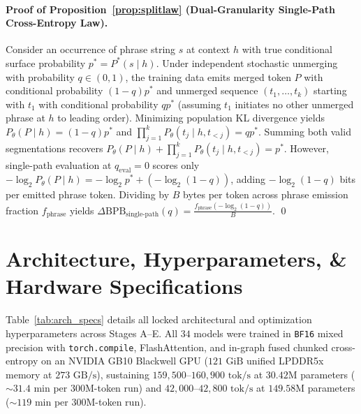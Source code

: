 \documentclass[11pt,a4paper]{article}
\begin{document}
\paragraph{Proof of Proposition~\ref{prop:splitlaw} (Dual-Granularity Single-Path Cross-Entropy Law).}
Consider an occurrence of phrase string $s$ at context $h$ with true conditional surface probability $p^* = P^*(s \mid h)$. Under independent stochastic unmerging with probability $q \in (0, 1)$, the training data emits merged token $P$ with conditional probability $(1-q)p^*$ and unmerged sequence $(t_1, \dots, t_k)$ starting with $t_1$ with conditional probability $q p^*$ (assuming $t_1$ initiates no other unmerged phrase at $h$ to leading order). Minimizing population KL divergence yields $P_\theta(P \mid h) = (1-q)p^*$ and $\prod_{j=1}^k P_\theta(t_j \mid h, t_{<j}) = q p^*$. Summing both valid segmentations recovers $P_\theta(P \mid h) + \prod_{j=1}^k P_\theta(t_j \mid h, t_{<j}) = p^*$. However, single-path evaluation at $q_{\text{eval}}=0$ scores only $-\log_2 P_\theta(P \mid h) = -\log_2 p^* + (-\log_2(1-q))$, adding $-\log_2(1-q)$ bits per emitted phrase token. Dividing by $B$ bytes per token across phrase emission fraction $f_{\text{phrase}}$ yields $\Delta\text{BPB}_{\text{single-path}}(q) = \frac{f_{\text{phrase}}(-\log_2(1-q))}{B}$. \qed

\section{Architecture, Hyperparameters, \& Hardware Specifications}
\label{app:hyperparams}

Table~\ref{tab:arch_specs} details all locked architectural and optimization hyperparameters across Stages A--E. All $34$ models were trained in \texttt{BF16} mixed precision with \texttt{torch.compile}, FlashAttention, and in-graph fused chunked cross-entropy on an NVIDIA GB10 Blackwell GPU ($121\text{ GiB}$ unified LPDDR5x memory at $273\text{ GB/s}$), sustaining $159{,}500$--$160{,}900\text{ tok/s}$ at $30.42\text{M}$ parameters ($\sim 31.4\text{ min}$ per $300\text{M}$-token run) and $42{,}000$--$42{,}800\text{ tok/s}$ at $149.58\text{M}$ parameters ($\sim 119\text{ min}$ per $300\text{M}$-token run).
\end{document}
